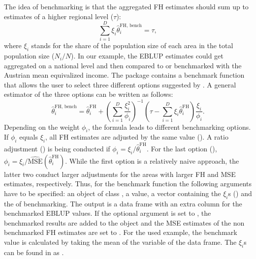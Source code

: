 The idea of benchmarking is that the aggregated FH estimates should sum up to estimates of a higher regional level ($\tau$):
%
\begin{equation*}
\sum_{i=1}^{D} \xi_{i} \hat{\theta}_{i}^{\text{FH, bench}} = \tau,
\end{equation*}
%
where $\xi_{i}$ stands for the share of the population size of each area in the total population size ($N_{i}/N$).
In our example, the EBLUP estimates could get aggregated on a national level and then compared to or benchmarked with the Austrian mean equivalized income. The  package contains a benchmark function that allows the user to select three different options suggested by \citet{Datta2011b}. A general estimator of the three options can be written as follows:
%
\begin{equation*}
\hat{\theta}_{i}^{\text{FH, bench}} = \hat{\theta}_{i}^{\text{FH}} + \left( \sum_{i=1}^{D} \frac{\xi_{i}^2}{\phi_{i}} \right)^{-1} \left( \tau - \sum_{i=1}^{D} \xi_{i}\hat{\theta}_{i}^{\text{FH}}  \right) \frac{\xi_{i}}{\phi_{i}}.
\end{equation*}
%
Depending on the weight $\phi_{i}$, the formula leads to different benchmarking options.  If $\phi_{i}$ equals $\xi_{i}$, all FH estimates are adjusted by the same value (). A ratio adjustment () is being conducted if $\phi_{i} = \xi_{i}/\hat{\theta}_{i}^{\text{FH}}$. For the last option (), $\phi_{i} = \xi_{i}/{\widehat{\text{MSE}}\left(\hat{\theta}_{i}^{\text{FH}}\right)}$. While the first option is a relatively naive approach, the latter two conduct larger adjustments for the areas with larger FH and MSE estimates, respectively. Thus, for the benchmark function the following arguments have to be specified: an object of class , a  value, a vector containing the $\xi_{i}$s () and the  of benchmarking. The output is a data frame with an extra column  for the benchmarked EBLUP values. If the optional argument  is set to , the benchmarked results are added to the  object and the MSE estimates of the non benchmarked FH estimates are set to .
For the used example, the benchmark value is calculated by taking the mean of the variable  of the  data frame. The $\xi_{i}$s can be found in  as .
